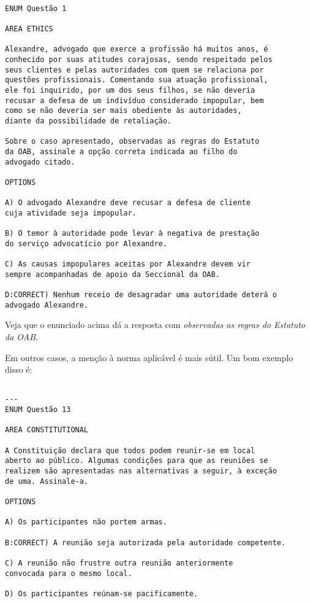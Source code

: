 \documentclass{article}
\begin{document}
\begin{verbatim}

ENUM Questão 1 

AREA ETHICS

Alexandre, advogado que exerce a profissão há muitos anos, é 
conhecido por suas atitudes corajosas, sendo respeitado pelos 
seus clientes e pelas autoridades com quem se relaciona por 
questões profissionais. Comentando sua atuação profissional, 
ele foi inquirido, por um dos seus filhos, se não deveria 
recusar a defesa de um indivíduo considerado impopular, bem 
como se não deveria ser mais obediente às autoridades, 
diante da possibilidade de retaliação. 
 
Sobre o caso apresentado, observadas as regras do Estatuto 
da OAB, assinale a opção correta indicada ao filho do 
advogado citado. 
 
OPTIONS

A) O advogado Alexandre deve recusar a defesa de cliente 
cuja atividade seja impopular. 

B) O temor à autoridade pode levar à negativa de prestação 
do serviço advocatício por Alexandre. 

C) As causas impopulares aceitas por Alexandre devem vir 
sempre acompanhadas de apoio da Seccional da OAB. 

D:CORRECT) Nenhum receio de desagradar uma autoridade deterá o 
advogado Alexandre.
\end{verbatim}

Veja que o enunciado acima dá a resposta com \textit{observadas as regras do Estatuto da OAB}.

Em outros casos, a menção à norma aplicável é mais sútil. Um bom exemplo disso é:

\begin{verbatim}

---
ENUM Questão 13 

AREA CONSTITUTIONAL

A Constituição declara que todos podem reunir-se em local 
aberto ao público. Algumas condições para que as reuniões se 
realizem são apresentadas nas alternativas a seguir, à exceção 
de uma. Assinale-a. 

OPTIONS

A) Os participantes não portem armas. 

B:CORRECT) A reunião seja autorizada pela autoridade competente. 

C) A reunião não frustre outra reunião anteriormente 
convocada para o mesmo local. 

D) Os participantes reúnam-se pacificamente. 


\end{verbatim}
\end{document}
